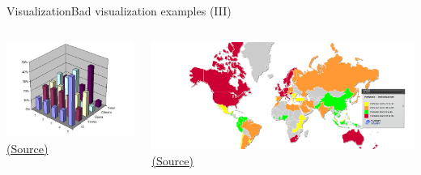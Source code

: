 \documentclass[10pt,compress]{beamer} %
\begin{document}
\begin{frame}{Visualization}{Bad visualization examples (III)}
	\begin{columns}
	\centering \includegraphics[width=\textwidth]{figs/bad6.jpg}\\
	\centering \tiny \href{http://livingqlikview.com/the-9-worst-data-visualizations-ever-created/}{(Source)}

	\centering \includegraphics[width=\textwidth]{figs/bad12.png}\\
	\centering \tiny \href{http://viz.wtf/}{(Source)}
	\end{columns}
\end{frame}
\end{document}
